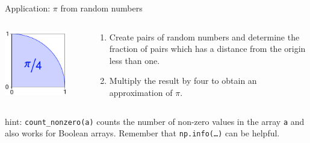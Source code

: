 \documentclass[svgnames]{beamer}
\begin{document}
\begin{frame}{Application: $\pi$ from random numbers}
 \begin{columns}
  \begin{column}{0.4\textwidth}
   \begin{center}
    \includegraphics[width=0.8\textwidth]{random_pi}
   \end{center}
  \end{column}%
  \begin{column}{0.6\textwidth}
   \begin{enumerate}
    \item Create pairs of random numbers and determine the fraction of pairs which
          has a distance from the origin less than one.
    \item Multiply the result by four to obtain an approximation of $\pi$.
   \end{enumerate}
  \end{column}
 \end{columns}

 \vspace{0.5truecm}
 hint: \texttt{count\_nonzero(a)} counts the number of non-zero values in the array \texttt{a} and
 also works for Boolean arrays. Remember that \texttt{np.info(\dots)} can be helpful.


\end{frame}
\end{document}

